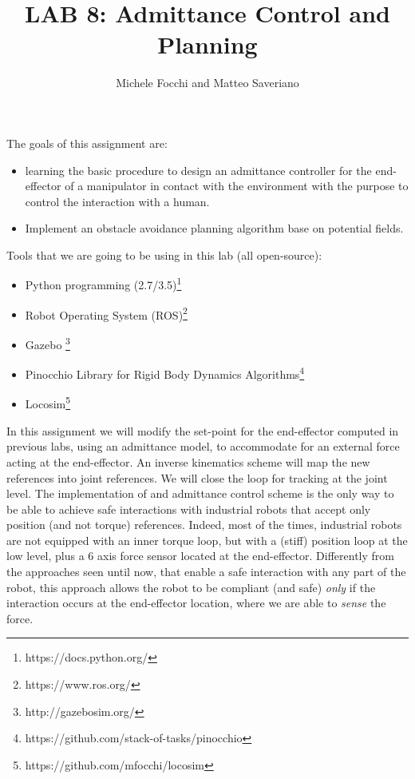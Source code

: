 \documentclass[11pt]{article}
\title{LAB 8: Admittance Control and Planning}
\author{Michele Focchi and Matteo Saveriano}
\date{}
\begin{document}
	\maketitle
	\noindent
	The goals of this assignment are:
	\begin{itemize}
		\item learning the basic procedure to design an admittance controller for the end-effector of a manipulator in contact with the environment with the purpose to control the interaction with a human.
		\item Implement an obstacle avoidance planning algorithm base on potential fields. 
	\end{itemize}
	
	\noindent
	Tools that we are going to be using in this lab (all open-source):
	\begin{itemize}
				\item Python programming (2.7/3.5)\footnote{https://docs.python.org/}
				\item Robot Operating System (ROS)\footnote{https://www.ros.org/}
						\item Gazebo \footnote{http://gazebosim.org/}
										\item Pinocchio Library for Rigid Body Dynamics Algorithms\footnote{https://github.com/stack-of-tasks/pinocchio}
				\item Locosim\footnote{https://github.com/mfocchi/locosim}
	\end{itemize}
	In this assignment we will modify the set-point for the end-effector computed in previous labs, using an admittance model, to accommodate for an external force acting at the end-effector. An inverse kinematics scheme will map the new references into joint references. We will close the loop for tracking at the joint level. The implementation of and admittance control scheme is the only way to be able to  achieve safe interactions with industrial robots that accept only position (and not torque) references. Indeed, most of the times, industrial robots are not equipped with an inner torque loop, but with a (stiff) position loop at the low level, plus a 6 axis force sensor located at the end-effector. Differently from the approaches seen until now, that enable a safe interaction with any part of the robot, this approach allows the robot to be compliant (and safe) \textit{only} if the interaction occurs at the end-effector location, where we are able to \textit{sense} the force. 
	
\end{document}
